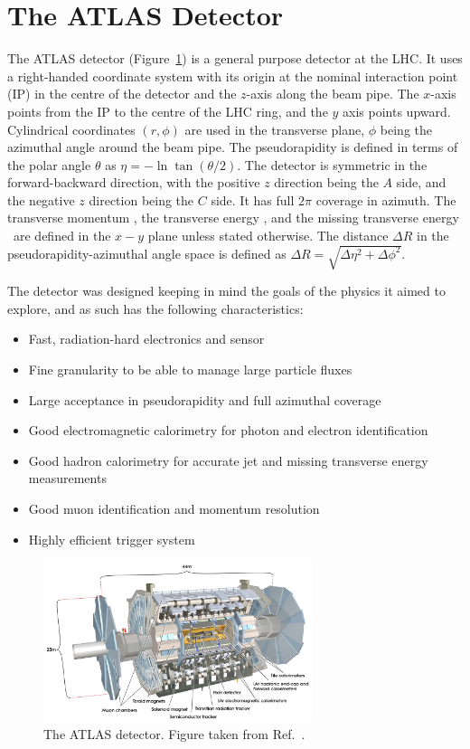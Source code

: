 \section{The ATLAS Detector}
The ATLAS detector (Figure~\ref{fig:atlas}) is a general purpose detector at the LHC.
It uses a right-handed coordinate system with its origin at the nominal interaction point (IP) in the
 centre of the detector and the $z$-axis along the beam pipe.
The $x$-axis points from the IP to the centre of the LHC ring, and the $y$ axis points upward.
Cylindrical coordinates 
 $(r,\phi)$ are used in the transverse plane, $\phi$ being the azimuthal angle around the beam pipe.
The pseudorapidity is defined in terms of the polar angle $\theta$ as 
 $\eta=-\ln\tan(\theta/2)$.
The detector is symmetric in the forward-backward direction, with the positive $z$ direction being the $A$ side, and the negative $z$ direction being the $C$ side.
It has full $2\pi$ coverage in azimuth.
 The transverse momentum \pt, the transverse energy \Et, and the missing transverse energy \Etmiss\ are defined in the $x-y$ plane unless stated otherwise.
The distance $\Delta R$ in the pseudorapidity-azimuthal angle space is defined as $\Delta R = \sqrt{\Delta \eta^2 + \Delta \phi^2}$.

The detector was designed keeping in mind the goals of the physics it aimed to explore, and as such has the following characteristics:
\begin{itemize}
\item Fast, radiation-hard electronics and sensor
\item Fine granularity to be able to manage large particle fluxes
\item Large acceptance in pseudorapidity and full azimuthal coverage
\item Good electromagnetic calorimetry for photon and electron identification
\item Good hadron calorimetry for accurate jet and missing transverse energy measurements
\item Good muon identification and momentum resolution
\item Highly efficient trigger system 
\end{itemize}

\begin{figure}[ht]
	\centering
	\includegraphics[width=0.7\textwidth]{figures/setup/atlas.pdf}
	\caption{The ATLAS detector.
Figure taken from Ref.~\cite{Aad:2008zzm}.}	
	\label{fig:atlas}
\end{figure}


